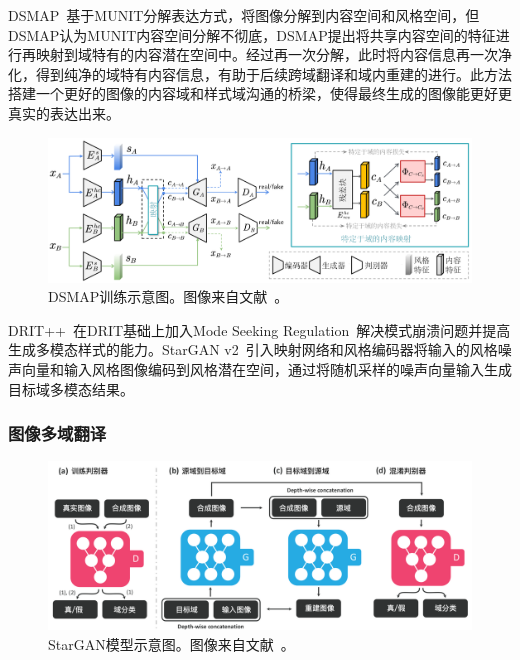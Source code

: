DSMAP~\cite{chang2020domain}基于MUNIT分解表达方式，将图像分解到内容空间和风格空间，但DSMAP认为MUNIT内容空间分解不彻底，DSMAP提出将共享内容空间的特征进行再映射到域特有的内容潜在空间中。经过再一次分解，此时将内容信息再一次净化，得到纯净的域特有内容信息，有助于后续跨域翻译和域内重建的进行。此方法搭建一个更好的图像的内容域和样式域沟通的桥梁，使得最终生成的图像能更好更真实的表达出来。

\begin{figure}[ht]
    \centering
	\includegraphics[width=\textwidth]{figures/DSMAP.pdf}
	\caption{DSMAP训练示意图。图像来自文献~\cite{chang2020domain}。}
	\label{fig:dsmap}
\end{figure}


DRIT++~\cite{lee2020drit++}在DRIT基础上加入Mode Seeking Regulation~\cite{mao2019mode}解决模式崩溃问题并提高生成多模态样式的能力。StarGAN v2~\cite{choi2020stargan}引入映射网络和风格编码器将输入的风格噪声向量和输入风格图像编码到风格潜在空间，通过将随机采样的噪声向量输入生成目标域多模态结果。

\subsubsection{图像多域翻译}

\begin{figure}[ht]
    \centering
	\includegraphics[width=\textwidth]{figures/star.png}
	\caption{StarGAN模型示意图。图像来自文献~\cite{choi2018stargan}。}
	\label{fig:star}
\end{figure}

